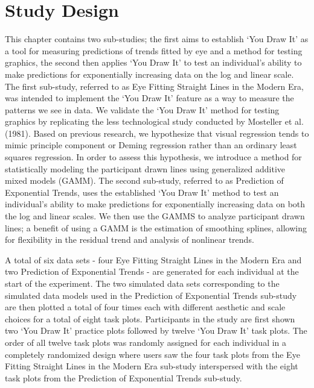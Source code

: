 \documentclass[print]{nuthesis}
\begin{document}
\hypertarget{study-design-1}{%
\section{Study Design}\label{study-design-1}}

This chapter contains two sub-studies; the first aims to establish `You Draw It' as a tool for measuring predictions of trends fitted by eye and a method for testing graphics, the second then applies `You Draw It' to test an individual's ability to make predictions for exponentially increasing data on the log and linear scale.
The first sub-study, referred to as Eye Fitting Straight Lines in the Modern Era, was intended to implement the `You Draw It' feature as a way to measure the patterns we see in data. We validate the `You Draw It' method for testing graphics by replicating the less technological study conducted by Mosteller et al. (1981).
Based on previous research, we hypothesize that visual regression tends to mimic principle component or Deming regression rather than an ordinary least squares regression.
In order to assess this hypothesis, we introduce a method for statistically modeling the participant drawn lines using generalized additive mixed models (GAMM).
The second sub-study, referred to as Prediction of Exponential Trends, uses the established `You Draw It' method to test an individual's ability to make predictions for exponentially increasing data on both the log and linear scales.
We then use the GAMMS to analyze participant drawn lines; a benefit of using a GAMM is the estimation of smoothing splines, allowing for flexibility in the residual trend and analysis of nonlinear trends.

A total of six data sets - four Eye Fitting Straight Lines in the Modern Era and two Prediction of Exponential Trends - are generated for each individual at the start of the experiment.
The two simulated data sets corresponding to the simulated data models used in the Prediction of Exponential Trends sub-study are then plotted a total of four times each with different aesthetic and scale choices for a total of eight task plots.
Participants in the study are first shown two `You Draw It' practice plots followed by twelve `You Draw It' task plots.
The order of all twelve task plots was randomly assigned for each individual in a completely randomized design where users saw the four task plots from the Eye Fitting Straight Lines in the Modern Era sub-study interspersed with the eight task plots from the Prediction of Exponential Trends sub-study.
\end{document}
